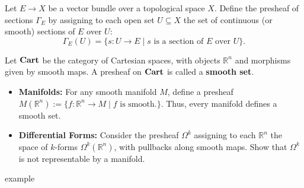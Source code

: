 \begin{example}
Let $E \to X$ be a vector bundle over a topological space $X$. Define the presheaf of sections $\Gamma_E$ by assigning to each open set $U \subseteq X$ the set of continuous (or smooth) sections of $E$ over $U$:
\[
\Gamma_E(U) = \{ s : U \to E \mid s \text{ is a section of } E \text{ over } U \}.
\]
\end{example}

\begin{example}
Let $\mathbf{Cart}$ be the category of Cartesian spaces, with objects $\mathbb{R}^n$ and morphisms given by smooth maps. A presheaf on $\mathbf{Cart}$ is called a \textbf{smooth set}.
\begin{itemize}
  \item \textbf{Manifolds:} For any smooth manifold $M$, define a presheaf $M(\mathbb{R}^n) := \{f: \mathbb{R}^n\to M \mid f \text{ is smooth.}\}$. Thus, every manifold defines a smooth set.
  \item \textbf{Differential Forms:} Consider the presheaf $\Omega^k$ assigning to each $\mathbb{R}^n$ the space of $k$-forms $\Omega^k(\mathbb{R}^n)$, with pullbacks along smooth maps. Show that $\Omega^k$ is not representable by a manifold.
\end{itemize}
\end{example}

\begin{example}
  example
\end{example}

